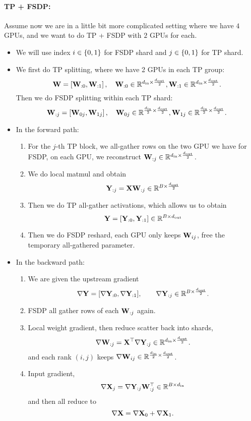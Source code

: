 \documentclass[11pt]{article}  %
\begin{document}
\paragraph{TP + FSDP:}
Assume now we are in a little bit more complicated setting where we have $4$ GPUs, and we want to do TP + FSDP with $2$ GPUs for each.
\begin{itemize}
  \item We will use index $i \in \left\{ 0, 1 \right\}$ for FSDP shard and $j \in \left\{ 0, 1 \right\}$ for TP shard.
  \item We first do TP splitting, where we have 2 GPUs in each TP group: 
  \[
    \mathbf{W} = \left[ \mathbf{W}_{:0}, \mathbf{W}_{:1} \right], \quad \mathbf{W}_{:0} \in \mathbb{R}^{d_{\text{in}} \times \frac{d_{\text{out}}}{2}}, \mathbf{W}_{:1} \in \mathbb{R}^{d_{\text{in}} \times \frac{d_{\text{out}}}{2}}.
  \]
  Then we do FSDP splitting within each TP shard:
  \[
    \mathbf{W}_{:j} = \left[ \mathbf{W}_{0j}, \mathbf{W}_{1j} \right], \quad \mathbf{W}_{0j} \in \mathbb{R}^{\frac{d_{\text{in}}}{2} \times \frac{d_{\text{out}}}{2}}, \mathbf{W}_{1j} \in \mathbb{R}^{\frac{d_{\text{in}}}{2} \times \frac{d_{\text{out}}}{2}}.
  \]

  \item In the forward path:
  \begin{enumerate}
    \item For the $j$-th TP block, we all-gather rows on the two GPU we have for FSDP, on each GPU, we reconstruct $\mathbf{W}_{:j} \in \mathbb{R}^{d_{\text{in}} \times \frac{d_{\text{out}}}{2}}$.
    \item We do local matmul and obtain 
    \[
      \mathbf{Y}_{:j} = \mathbf{X}\mathbf{W}_{:j} \in \mathbb{R}^{B \times \frac{d_{\text{out}}}{2}}
    \]
    \item Then we do TP all-gather activations, which allows us to obtain
    \[
      \mathbf{Y} = [\mathbf{Y}_{:0}, \mathbf{Y}_{:1}] \in \mathbb{R}^{B \times d_{\text{out}}}
    \]

    \item Then we do FSDP reshard, each GPU only keeps $\mathbf{W}_{ij}$, free the temporary all-gathered parameter.
  \end{enumerate}

  \item In the backward path:
  \begin{enumerate}
    \item We are given the upstream gradient 
    \[
      \nabla \mathbf{Y} = [\nabla \mathbf{Y}_{:0}, \nabla \mathbf{Y}_{:1}], \qquad \nabla \mathbf{Y}_{:j} \in \mathbb{R}^{B \times \frac{d_{\text{out}}}{2}}.
    \]

    \item FSDP all gather rows of each $\mathbf{W}_{:j}$ again.
    \item Local weight gradient, then reduce scatter back into shards,
    \[
      \nabla \mathbf{W}_{:j} = \mathbf{X}^{\top}\nabla\mathbf{Y}_{:j} \in \mathbb{R}^{d_{\text{in}} \times \frac{d_{\text{out}}}{2}}.
    \]
    and each rank $(i, j)$ keeps $\nabla \mathbf{W}_{ij} \in \mathbb{R}^{\frac{d_{\text{in}}}{2} \times \frac{d_{\text{out}}}{2}}$.
    \item Input gradient, 
    \[ 
      \nabla \mathbf{X}_j = \nabla\mathbf{Y}_{:j}\mathbf{W}_{:j}^{\top} \in \mathbb{R}^{B \times d_{\text{in}}}
    \]
    and then all reduce to 
    \[
      \nabla \mathbf{X} = \nabla \mathbf{X}_0 + \nabla \mathbf{X}_1.
    \]
  \end{enumerate}


\end{itemize}
\end{document}
